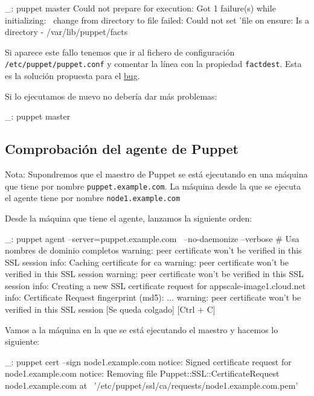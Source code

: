 \begin{bashcode}
_: puppet master
Could not prepare for execution: Got 1 failure(s) while initializing: \
change from directory to file failed: 
Could not set 'file on ensure: Is a directory - /var/lib/puppet/facts
\end{bashcode}

Si aparece este fallo tenemos que ir al fichero de configuración \texttt{/etc/puppet/puppet.conf} y comentar la línea con la propiedad \texttt{factdest}. Esta es la solución propuesta para el \href{https://projects.puppetlabs.com/issues/9491}{bug}.

Si lo ejecutamos de nuevo no debería dar más problemas:

\begin{bashcode}
_: puppet master
\end{bashcode}


\subsection{Comprobación del agente de Puppet}

Nota: Supondremos que el maestro de Puppet se está ejecutando en una máquina que tiene por nombre \texttt{puppet.example.com}. La máquina desde la que se ejecuta el agente tiene por nombre \texttt{node1.example.com}

Desde la máquina que tiene el agente, lanzamos la siguiente orden:

\begin{bashcode}
_: puppet agent --server=puppet.example.com \
--no-daemonize --verbose   # Usa nombres de dominio completos
warning: peer certificate won't be verified in this SSL session
info: Caching certificate for ca
warning: peer certificate won't be verified in this SSL session
warning: peer certificate won't be verified in this SSL session
info: Creating a new SSL certificate request for appscale-image1.cloud.net
info: Certificate Request fingerprint (md5): ... 
warning: peer certificate won't be verified in this SSL session
[Se queda colgado]
[Ctrl + C]
\end{bashcode}

Vamos a la máquina en la que se está ejecutando el maestro y hacemos lo siguiente:

\begin{bashcode}
_: puppet cert --sign node1.example.com
notice: Signed certificate request for node1.example.com
notice: Removing file Puppet::SSL::CertificateRequest node1.example.com at \
'/etc/puppet/ssl/ca/requests/node1.example.com.pem'
\end{bashcode}

